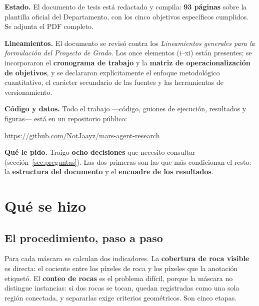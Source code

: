 \documentclass[11pt]{article}
\newcounter{preg}
\begin{document}
\begin{caja}
\noindent\textbf{Estado.} El documento de tesis está redactado y compila:
\textbf{93 páginas} sobre la plantilla oficial del Departamento, con los cinco objetivos
específicos cumplidos. Se adjunta el PDF completo.

\smallskip
\noindent\textbf{Lineamientos.} El documento se revisó contra los \textit{Lineamientos
generales para la formulación del Proyecto de Grado}. Los once elementos (i--xi) están
presentes; se incorporaron el \textbf{cronograma de trabajo} y la \textbf{matriz de
operacionalización de objetivos}, y se declararon explícitamente el enfoque metodológico
cuantitativo, el carácter secundario de las fuentes y las herramientas de versionamiento.

\smallskip
\noindent\textbf{Código y datos.} Todo el trabajo —código, guiones de ejecución,
resultados y figuras— está en un repositorio público:

\begin{center}
\small\url{https://github.com/NotJaayz/mars-agent-research}
\end{center}

\noindent\textbf{Qué le pido.} Traigo \textbf{ocho decisiones} que necesito consultar
(sección~\ref{sec:preguntas}). Las dos primeras son las que más condicionan el resto:
la \textbf{estructura del documento} y el \textbf{encuadre de los resultados}.
\end{caja}

\section{Qué se hizo}

\subsection{El procedimiento, paso a paso}

Para cada máscara se calculan dos indicadores. La \textbf{cobertura de roca visible} es
directa: el cociente entre los píxeles de roca y los píxeles que la anotación etiquetó.
El \textbf{conteo de rocas} es el problema difícil, porque la máscara no distingue
instancias: si dos rocas se tocan, quedan registradas como una sola región conectada, y
separarlas exige criterios geométricos. Son cinco etapas.
\end{document}
